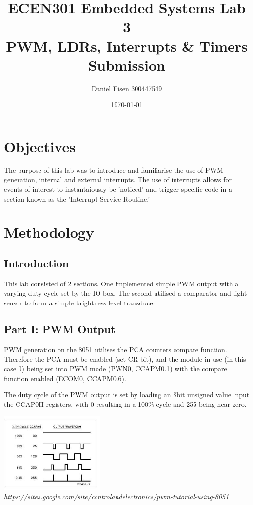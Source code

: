 \documentclass[11pt]{article}
\title{ECEN301 Embedded Systems Lab 3 \\ PWM, LDRs, Interrupts \& Timers Submission}
\author{Daniel Eisen 300447549}
\date{\today}
\begin{document}
\begin{preview}
\maketitle
\section{Objectives}
The purpose of this lab was to introduce and familiarise the use of PWM generation, internal and external interrupts. The use of interrupts allows for events of interest to instantaiously be 'noticed' and trigger specific code in a section known as the 'Interrupt Service Routine.'

\section{Methodology}
        \subsection{Introduction}
        This lab consisted of 2 sections.
        One implemented simple PWM output with a varying duty cycle set by the IO box.
        The second utilised a comparator and light sensor to form a simple brightness level transducer
        \subsection{Part I: PWM Output}
        PWM generation on the 8051 utilises the PCA counters compare function. Therefore the PCA must be enabled (set CR bit), and the module in use (in this case 0) being set into PWM mode (PWN0, CCAPM0.1) with the compare function enabled (ECOM0, CCAPM0.6).

        

        The duty cycle of the PWM output is set by loading an 8bit unsigned value input the CCAP0H registers, with 0 resulting in a 100\% cycle and 255 being near zero.

        \begin{center}
          \includegraphics[width=0.39\textwidth]{inc/select duty cycle.jpg}
          \textit{\url{https://sites.google.com/site/controlandelectronics/pwm-tutorial-using-8051}}
        \end{center}


\end{preview}
\end{document}
